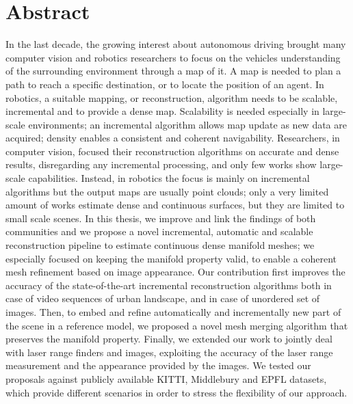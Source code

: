 \vspace{-10pt}

\chapter*{Abstract}
\vspace{-10pt}

 

In the last decade, the growing interest about autonomous driving brought many computer vision and robotics researchers to focus on the  vehicles understanding of the surrounding environment through a map of it.
A map is needed to plan a path to reach a specific destination, or to locate the position of an agent.
In robotics, a suitable mapping, or reconstruction, algorithm needs  to be scalable, incremental and to provide a dense map. 
Scalability is needed especially in large-scale environments; an incremental algorithm allows map update as new data are acquired; density enables a consistent and coherent navigability.
Researchers, in computer vision, focused their reconstruction algorithms on accurate and dense results, disregarding any incremental processing, and only few works show large-scale capabilities.
Instead, in robotics the focus is mainly on incremental algorithms but the output maps are usually point clouds; only a very limited amount of works estimate dense and continuous surfaces, but they are limited to small scale scenes.
In this thesis, we improve and link the findings of both communities and we propose a novel incremental, automatic and scalable reconstruction  pipeline to estimate continuous dense manifold meshes; we especially focused on keeping the manifold property valid, to enable a coherent mesh refinement based on image appearance.  
Our contribution first improves the accuracy of the state-of-the-art incremental reconstruction algorithms both in case of video sequences of urban landscape, and in case of unordered set of images.
Then, to embed and refine automatically and incrementally new part of the scene in a reference model, we proposed a novel mesh merging algorithm that preserves the manifold property.
Finally, we extended our work to jointly deal with laser range finders and images, exploiting the accuracy of the laser range measurement and the appearance provided by the images.
We tested our proposals against publicly available KITTI, Middlebury and EPFL datasets, which provide different scenarios in order to stress the flexibility of our approach.

